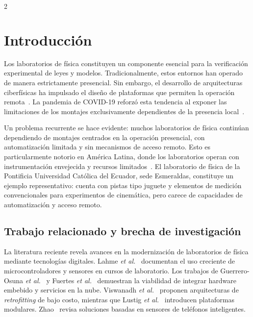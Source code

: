 \documentclass[12pt,twoside,titlepage]{ingenius}
\begin{document}
\begin{multicols}{2}
\section{Introducci\'on}
\vspace{-0.15cm}

Los laboratorios de f\'isica constituyen un componente esencial para la verificaci\'on experimental de leyes y modelos. Tradicionalmente, estos entornos han operado de manera estrictamente presencial. Sin embargo, el desarrollo de arquitecturas ciberf\'isicas ha impulsado el dise\~no de plataformas que permiten la operaci\'on remota~\cite{r1}. La pandemia de COVID-19 reforz\'o esta tendencia al exponer las limitaciones de los montajes exclusivamente dependientes de la presencia local~\cite{r2}.

Un problema recurrente se hace evidente: muchos laboratorios de f\'isica contin\'uan dependiendo de montajes centrados en la operaci\'on presencial, con automatizaci\'on limitada y sin mecanismos de acceso remoto. Esto es particularmente notorio en Am\'erica Latina, donde los laboratorios operan con instrumentaci\'on envejecida y recursos limitados~\cite{r3,r4}. El laboratorio de f\'isica de la Pontificia Universidad Cat\'olica del Ecuador, sede Esmeraldas, constituye un ejemplo representativo: cuenta con pistas tipo juguete y elementos de medici\'on convencionales para experimentos de cinem\'atica, pero carece de capacidades de automatizaci\'on y acceso remoto.

\subsection{Trabajo relacionado y brecha de investigaci\'on}

La literatura reciente revela avances en la modernizaci\'on de laboratorios de f\'isica mediante tecnolog\'ias digitales. Lahme \textit{et al.}~\cite{r1} documentan el uso creciente de microcontroladores y sensores en cursos de laboratorio. Los trabajos de Guerrero-Osuna \textit{et al.}~\cite{r4} y Fuertes \textit{et al.}~\cite{r3} demuestran la viabilidad de integrar hardware embebido y servicios en la nube. Viswanadh \textit{et al.}~\cite{r2} proponen arquitecturas de \textit{retrofitting} de bajo costo, mientras que Lustig \textit{et al.}~\cite{r5} introducen plataformas modulares. Zhao~\cite{r6} revisa soluciones basadas en sensores de tel\'efonos inteligentes.


\end{multicols}
\end{document}
